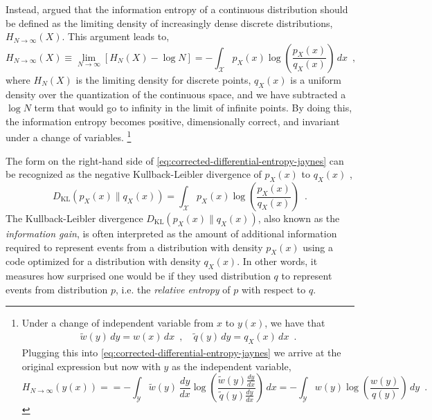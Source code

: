 Instead, \textcite{jaynes_information_1957,jaynes_prior_1968} argued that the information entropy of a continuous distribution should be defined as the limiting density of increasingly dense discrete distributions, $H_{N\rightarrow\infty}(X)$. This argument leads to,
%
\begin{equation} \label{eq:corrected-differential-entropy-jaynes}
    H_{N\rightarrow\infty}(X) \equiv \lim_{N\rightarrow\infty} [H_{N}(X) - \log N] = - \int_{\mathcal{X}} p_X(x) \log \left(\frac{p_X(x)}{q_X(x)}\right) \, dx \enspace ,
\end{equation}
%
where $H_N(X)$ is the limiting density for discrete points, $q_X(x)$ is a uniform density over the quantization of the continuous space, and we have subtracted a $\log N$ term that would go to infinity in the limit of infinite points.
By doing this, the information entropy becomes positive, dimensionally correct, and invariant under a change of variables.%
\footnote{\label{fn:change-of-variables-invariance-of-corrected-differential-entropy}
    Under a change of independent variable from $x$ to $y(x)$, we have that
    \begin{align*}
        \widetilde{w}(y)\,dy = w(x)\,dx \enspace , \quad
        \widetilde{q}(y)\,dy = q_X(x)\,dx \enspace .
    \end{align*}
    Plugging this into \cref{eq:corrected-differential-entropy-jaynes} we arrive at the original expression but now with $y$ as the independent variable,
    \begin{equation*}
        H_{N\rightarrow\infty}(y(x)) =  = - \int_{\mathcal{Y}} \widetilde{w}(y)\,\frac{dy}{dx} \log \left( \frac{\widetilde{w}(y)\frac{dy}{dx}}{\widetilde{q}(y)\frac{dy}{dx}} \right) \, dx = - \int_{\mathcal{Y}} w(y) \log \left( \frac{w(y)}{q(y)} \right) \, dy \enspace .
    \end{equation*}
}

The form on the right-hand side of \cref{eq:corrected-differential-entropy-jaynes} can be recognized as the negative Kullback-Leibler divergence of $p_X(x)$ to $q_X(x)$ \parencite{kullback_information_1959},
%
\begin{equation} \label{eq:kullback-leibler-divergence}
    D_{\mathrm{KL}}(p_X(x)\parallel q_X(x)) = \int_{\mathcal{X}} p_X(x) \log \left(\frac{p_X(x)}{q_X(x)}\right) \enspace .
\end{equation}
%
The Kullback-Leibler divergence $D_{\mathrm{KL}}(p_X(x)\parallel q_X(x))$, also known as the \emph{information gain}, is often interpreted as the amount of additional information required to represent events from a distribution with density $p_X(x)$ using a code optimized for a distribution with density $q_X(x)$. In other words, it measures how surprised one would be if they used distribution $q$ to represent events from distribution $p$, i.e. the \emph{relative entropy} of $p$ with respect to $q$.

